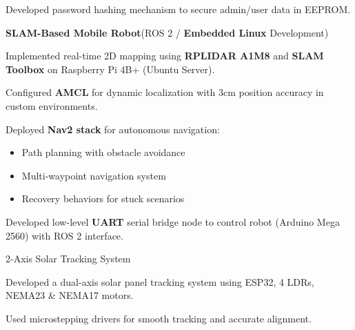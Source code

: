 \begin{cventries}
{\begin{cvitems}
        \item {Developed password hashing mechanism to secure admin/user data in EEPROM.}
      \end{cvitems}
    }
    \vspace{2mm}
  \cventry
    {\textbf{SLAM-Based Mobile Robot}(ROS 2 / \textbf{Embedded Linux} Development)} %
    {} %
    {} %
    {} %
    {
      \begin{cvitems} %
        \item {Implemented real-time 2D mapping using \textbf{RPLIDAR A1M8} and \textbf{SLAM Toolbox} on Raspberry Pi 4B+ (Ubuntu Server).}
        \item {Configured \textbf{AMCL} for dynamic localization with 3cm position accuracy in custom environments.}
        \item {Deployed \textbf{Nav2 stack} for autonomous navigation:}
          \begin{itemize}
            \vspace{1mm}
            \item Path planning with obstacle avoidance
            \item Multi-waypoint navigation system
            \item Recovery behaviors for stuck scenarios
          \end{itemize}
        \item {Developed low-level \textbf{UART} serial bridge node to control robot (Arduino Mega 2560) with ROS 2 interface.}
      \end{cvitems}
    }
  \cventry
    {2-Axis Solar Tracking System} %
    {} %
    {} %
    {} %
    {
      \begin{cvitems} %
        \item {Developed a dual-axis solar panel tracking system using ESP32, 4 LDRs, NEMA23 \& NEMA17 motors.}
        \item {Used microstepping drivers for smooth tracking and accurate alignment.}
      \end{cvitems}
    }


\end{cventries}